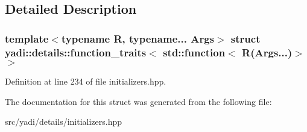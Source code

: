 \subsection{Detailed Description}
\subsubsection*{template$<$typename R, typename... Args$>$\newline
struct yadi\+::details\+::function\+\_\+traits$<$ std\+::function$<$ R(\+Args...)$>$ $>$}



Definition at line 234 of file initializers.\+hpp.



The documentation for this struct was generated from the following file\+:\begin{DoxyCompactItemize}
\item 
src/yadi/details/initializers.\+hpp\end{DoxyCompactItemize}
